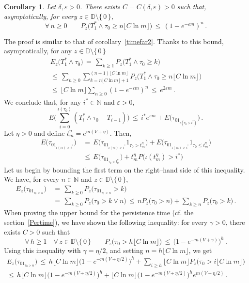 \documentclass[a4paper,12pt]{article}
\newtheorem{corollary}[theorem]{Corollary}
\theoremstyle{definition}
\theoremstyle{remark}
\def \g {\gamma}
\def \d {\delta}
\def \e {\varepsilon}
\def \dD {\mathbb{D}}
\def \N {\mathbb{N}}
\begin{document}
\begin{corollary}
Let $\d,\e>0$. There exists $C=C(\d,\e)>0$ such that, asymptotically,
for every $z\in\dD\setminus\lbrace\,0\,\rbrace$,
$$\forall\,n\geq 0\qquad
P_z\big(
T_1^*\wedge\tau_0\geq n\lfloor C\ln m\rfloor
\big)\,\leq\,(1-e^{-\e m})^n\,.$$
\end{corollary}
The proof is similar to that of corollary~\ref{timefar2}.
Thanks to this bound, asymptotically,
for any $z\in\dD\setminus\lbrace\,0\,\rbrace$
\begin{multline*}
E_z\big(
T_1^*\wedge\tau_0
\big)\,=\,\sum_{k\geq 1}P_z\big(
T_1^*\wedge\tau_0\geq k
\big)\\
\leq\,\sum_{n\geq0}\sum_{k=n\lfloor C\ln m\rfloor+1}^{(n+1)\lfloor C\ln m\rfloor}
P_z\big(
T_1^*\wedge\tau_0\geq n\lfloor C\ln m\rfloor
\big)\\
\leq\,\lfloor C\ln m\rfloor\sum_{n\geq 0}(1-e^{-\e m})^n\,\leq\,e^{2\e m}\,.
\end{multline*}
We conclude that, for any $i^*\in\N$ and $\e>0$,
$$E\bigg(
\sum_{i=0}^{\iota(\tau_0)}(T_i^*\wedge\tau_0-T_{i-1})
\bigg)\,\leq\,
i^*e^{\e m}+E\big(
\tau_01_{\iota(\tau_0>i^*)}
\big)\,.$$
Let $\eta>0$ and define $t^\eta_m=e^{m(V+\eta)}$. Then,
\begin{align*}
E\big(
\tau_01_{\iota(\tau_0)>i^*}
\big)
\,&=\,E\big(
\tau_01_{\iota(\tau_0)>i^*}1_{\tau_0>t^\eta_m}
\big)+E\big(
\tau_01_{\iota(\tau_0)>i^*}1_{\tau_0\leq t^\eta_m}
\big)
\\&\leq\, 
E\big(
\tau_01_{\tau_0>t^\eta_m}\big)+t^\eta_m P\big(
\iota(t^\eta_m)>i^*
\big)
\end{align*}
Let us begin by bounding the first term on the right--hand side of this inequality.
We have, for every $n\in\N$ and $z\in\dD\setminus \lbrace\,0\,\rbrace$,
\begin{align*}
E_z\big(
\tau_01_{\tau_0>n}
\big)\,&=\,\sum_{k\geq 0}P_z\big(
\tau_01_{\tau_0>n}>k
\big)\\&=\,\sum_{k\geq0}P_z\big(
\tau_0>k\vee n
\big)\,\leq\,nP_z\big(
\tau_0>n
\big)+\sum_{k\geq n}P_z\big(
\tau_0>k
\big)\,.
\end{align*}
When proving the upper bound for the persistence time
(cf. the section~\ref{Pertime}),
we have shown the following inequality:
for every $\g>0$, there exists $C>0$ such that
$$\forall \,h\geq1\quad
\forall\,z\in\dD\setminus\lbrace\,0\,\rbrace\qquad
P_z\big(
\tau_0>h\lfloor C\ln m\rfloor
\big)\,\leq\,\Big(
1-e^{-m(V+\g)}
\Big)^h\,.$$
Using this inequality with $\g=\eta/2$, 
and setting $n=h\lfloor C\ln m\rfloor$, we get
\begin{multline*}
\!\!\!\!E_z\big(
\tau_01_{\tau_0>n}
\big)\,
\leq\,h\lfloor C\ln m\rfloor\Big(
1-e^{-m(V+\eta/2)}
\Big)^h+
\sum_{i\geq h}\lfloor C\ln m\rfloor P_z\big(
\tau_0>i\lfloor C\ln m\rfloor
\big)\\
\leq\, h\lfloor C\ln m\rfloor\Big(
1-e^{-m(V+\eta/2)}
\Big)^h+\lfloor C\ln m\rfloor\Big(
1-e^{-m(V+\eta/2)}
\Big)^he^{m(V+\eta/2)}\,.
\end{multline*}
\end{document}
